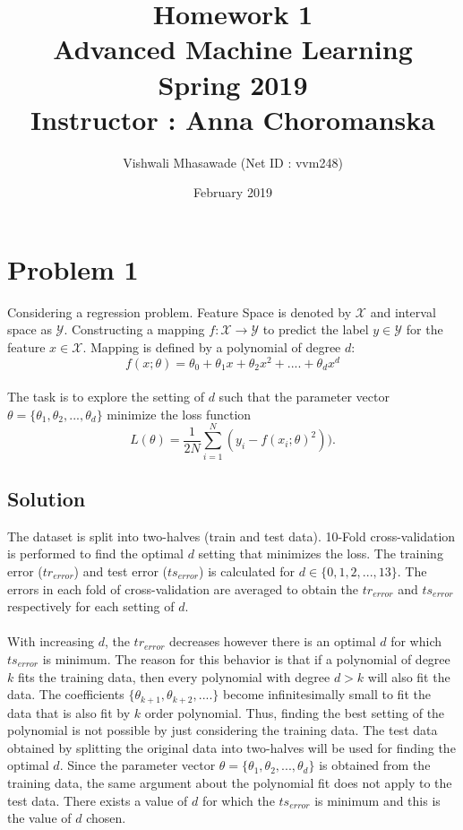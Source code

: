 \documentclass{article}
\title{Homework 1\\
    \large Advanced Machine Learning \\
    Spring 2019\\
    Instructor : Anna Choromanska}
\author{Vishwali Mhasawade (Net ID : vvm248)}
\date{February 2019}
\begin{document}
\maketitle

\section{Problem 1}
Considering a regression problem. Feature Space is denoted by $\mathcal X$ and interval space as $\mathcal Y$. Constructing a mapping $f : \mathcal X \rightarrow \mathcal Y$ to predict the label $y \in \mathcal Y$ for the feature $x \in \mathcal X$. Mapping is defined by a polynomial of degree $d$:
    \begin{equation}
        f(x;\theta) = \theta _0 + \theta_ 1 x + \theta_2 x^2 + .... + \theta_d x^d
    \end{equation}
\\
The task is to explore the setting of $d$ such that the parameter vector $\theta = \{ \theta_1, \theta_2,...,\theta_d \}$ minimize the loss function\\
\begin{equation}
    L(\theta) = \frac{1}{2N} \sum _{i=1} ^{N} (y_i - f(x_i;\theta)^2)).
\end{equation}
\subsection{Solution}
The dataset is split into two-halves (train and test data). 10-Fold cross-validation is performed to find the optimal $d$ setting that minimizes the loss. The training error ($tr _{error}$) and test error ($ts_{error}$) is calculated for $d \in \{0,1,2,...,13\}$. The errors in each fold of cross-validation are averaged to obtain the $tr_{error}$ and $ts_{error}$ respectively for each setting of $d$.\\
\\
With increasing $d$, the $tr_{error}$ decreases however there is an optimal $d$ for which $ts_{error}$ is minimum. The reason for this behavior is that if a polynomial of degree $k$ fits the training data, then every polynomial with degree $d > k$ will also fit the data. The coefficients $\{ \theta_{k+1}, \theta_{k+2}, .... \}$ become infinitesimally small to fit the data that is also fit by $k$ order polynomial. Thus, finding the best setting of the polynomial is not possible by just considering the training data. The test data obtained by splitting the original data into two-halves will be used for finding the optimal $d$. Since the parameter vector $\theta = \{ \theta_1, \theta_2,...,\theta_d \}$ is obtained from the training data, the same argument about the polynomial fit does not apply to the test data. There exists a value of $d$ for which the $ts_{error}$ is minimum and this is the value of $d$ chosen.
\end{document}
